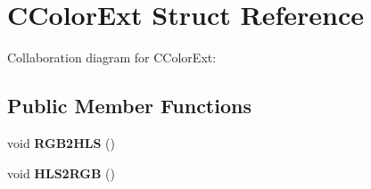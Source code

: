 \hypertarget{struct_c_color_ext}{\section{C\+Color\+Ext Struct Reference}
\label{struct_c_color_ext}
}


Collaboration diagram for C\+Color\+Ext\+:
\subsection*{Public Member Functions}
\begin{DoxyCompactItemize}
\item 
\hypertarget{struct_c_color_ext_a028b5ba1b5b4819f5fb9d5179286a760}{void {\bfseries R\+G\+B2\+H\+L\+S} ()}\label{struct_c_color_ext_a028b5ba1b5b4819f5fb9d5179286a760}

\item 
\hypertarget{struct_c_color_ext_ac7a5c7ae7d183b3a3a509b797020c5f1}{void {\bfseries H\+L\+S2\+R\+G\+B} ()}\label{struct_c_color_ext_ac7a5c7ae7d183b3a3a509b797020c5f1}

\end{DoxyCompactItemize}
